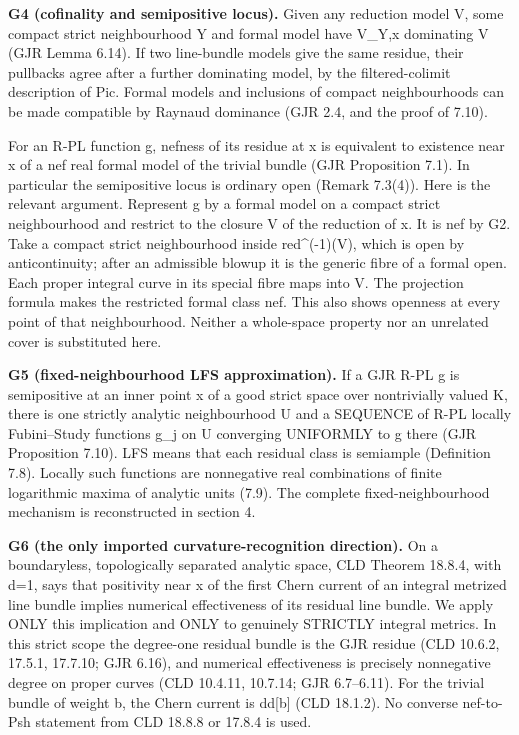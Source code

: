 \documentclass[
  11pt,
]{article}
\begin{document}
\textbf{G4 (cofinality and semipositive locus).} Given any reduction
model V, some compact strict neighbourhood Y and formal model have
V\_Y,x dominating V (GJR Lemma 6.14). If two line-bundle models give the
same residue, their pullbacks agree after a further dominating model, by
the filtered-colimit description of Pic. Formal models and inclusions of
compact neighbourhoods can be made compatible by Raynaud dominance (GJR
2.4, and the proof of 7.10).

For an R-PL function g, nefness of its residue at x is equivalent to
existence near x of a nef real formal model of the trivial bundle (GJR
Proposition 7.1). In particular the semipositive locus is ordinary open
(Remark 7.3(4)). Here is the relevant argument. Represent g by a formal
model on a compact strict neighbourhood and restrict to the closure V of
the reduction of x. It is nef by G2. Take a compact strict neighbourhood
inside red\^{}(-1)(V), which is open by anticontinuity; after an
admissible blowup it is the generic fibre of a formal open. Each proper
integral curve in its special fibre maps into V. The projection formula
makes the restricted formal class nef. This also shows openness at every
point of that neighbourhood. Neither a whole-space property nor an
unrelated cover is substituted here.

\textbf{G5 (fixed-neighbourhood LFS approximation).} If a GJR R-PL g is
semipositive at an inner point x of a good strict space over
nontrivially valued K, there is one strictly analytic neighbourhood U
and a SEQUENCE of R-PL locally Fubini--Study functions g\_j on U
converging UNIFORMLY to g there (GJR Proposition 7.10). LFS means that
each residual class is semiample (Definition 7.8). Locally such
functions are nonnegative real combinations of finite logarithmic maxima
of analytic units (7.9). The complete fixed-neighbourhood mechanism is
reconstructed in section 4.

\textbf{G6 (the only imported curvature-recognition direction).} On a
boundaryless, topologically separated analytic space, CLD Theorem
18.8.4, with d=1, says that positivity near x of the first Chern current
of an integral metrized line bundle implies numerical effectiveness of
its residual line bundle. We apply ONLY this implication and ONLY to
genuinely STRICTLY integral metrics. In this strict scope the degree-one
residual bundle is the GJR residue (CLD 10.6.2, 17.5.1, 17.7.10; GJR
6.16), and numerical effectiveness is precisely nonnegative degree on
proper curves (CLD 10.4.11, 10.7.14; GJR 6.7--6.11). For the trivial
bundle of weight b, the Chern current is dd{[}b{]} (CLD 18.1.2). No
converse nef-to-Psh statement from CLD 18.8.8 or 17.8.4 is used.
\end{document}

